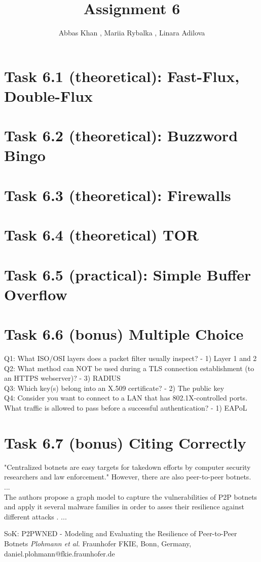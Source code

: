 \documentclass{article}
\title{Assignment 6}
\author{Abbas Khan , Mariia Rybalka , Linara Adilova}
\begin{document}
\maketitle 

\section*{Task 6.1 (theoretical): Fast-Flux, Double-Flux}

\section*{Task 6.2 (theoretical): Buzzword Bingo}

\section*{Task 6.3 (theoretical): Firewalls}

\section *{Task 6.4 (theoretical) TOR}

\section *{Task 6.5 (practical): Simple Buffer Overflow}

\section*{Task 6.6 (bonus) Multiple Choice}
Q1: What ISO/OSI layers does a packet filter usually inspect? - 1) Layer 1 and 2
\\
Q2: What method can NOT be used during a TLS connection establishment (to an HTTPS webserver)? - 3) RADIUS
\\
Q3: Which key(s) belong into an X.509 certificate? - 2) The public key
\\
Q4: Consider you want to connect to a LAN that has 802.1X-controlled ports. What traffic is allowed to pass before a successful authentication? - 1) EAPoL

\section*{Task 6.7 (bonus) Citing Correctly}
"Centralized botnets are easy targets for takedown efforts by computer security researchers and law enforcement." \cite{botnets} However, there are also peer-to-peer botnets.
\\...\\
The authors propose a graph model to capture the vulnerabilities of P2P botnets and apply it several malware families in order to asses their resilience against different attacks \cite{botnets}. ...

\begin{thebibliography}{9}

  SoK: P2PWNED - Modeling and Evaluating the Resilience of Peer-to-Peer Botnets
  \emph{Plohmann et al.}
  Fraunhofer FKIE, Bonn, Germany, daniel.plohmann@fkie.fraunhofer.de
    
\end{thebibliography}
\end{document}
